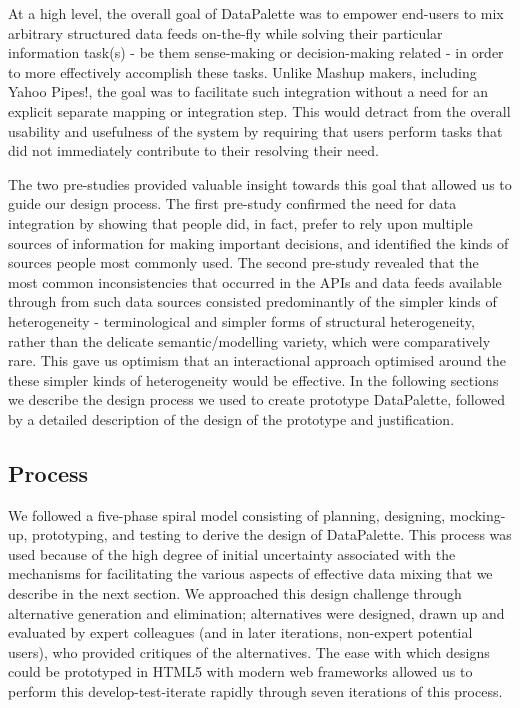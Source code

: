 \documentclass{sigchi}
\begin{document}
At a high level, the overall goal of DataPalette was to empower end-users to mix arbitrary structured data feeds on-the-fly while solving their particular information task(s) - be them sense-making or decision-making related - in order to more effectively accomplish these tasks.  Unlike Mashup makers, including Yahoo Pipes!, the goal was to facilitate such integration without a need for an explicit separate mapping or integration step.  This would detract from the overall usability and usefulness of the system by requiring that users perform tasks that did not immediately contribute to their resolving their need.

The two pre-studies provided valuable insight towards this goal that allowed us to guide our design process. The first pre-study confirmed the need for data integration by showing that people did, in fact, prefer to rely upon multiple sources of information for making important decisions, and identified the kinds of sources people most commonly used.  The second pre-study revealed that the most common inconsistencies that occurred in the APIs and data feeds available through from such data sources consisted predominantly of the simpler kinds of heterogeneity - terminological and simpler forms of structural heterogeneity, rather than the delicate semantic/modelling variety, which were comparatively rare. This gave us optimism that an interactional approach optimised around the these simpler kinds of heterogeneity would be effective.  In the following sections we describe the design process we used to create prototype DataPalette, followed by a detailed description of the design of the prototype and justification.

\subsection{Process}
We followed a five-phase spiral model consisting of planning, designing, mocking-up, prototyping, and testing to derive the design of DataPalette.  This process was used because of the high degree of initial uncertainty associated with the mechanisms for facilitating the various aspects of effective data mixing that we describe in the next section. We approached this design challenge through alternative generation and elimination; alternatives were designed, drawn up and evaluated by expert colleagues (and in later iterations, non-expert potential users), who provided critiques of the alternatives. The ease with which designs could be prototyped in HTML5 with modern web frameworks allowed us to perform this develop-test-iterate rapidly through seven iterations of this process.
\end{document}
